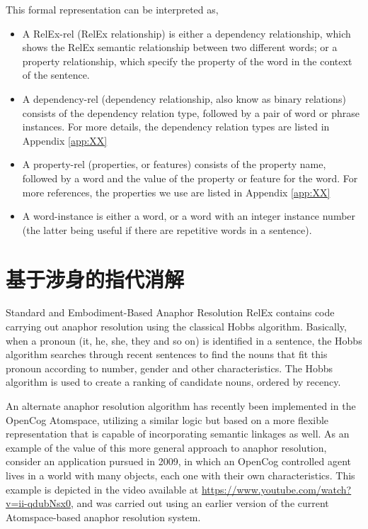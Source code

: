 This formal representation can be interpreted as,

\begin{itemize}
\item A RelEx-rel (RelEx relationship) is either a dependency relationship, which shows the RelEx semantic relationship between two different words;
  or a property relationship, which specify the property of the word in the context of the sentence. 
\item A dependency-rel (dependency relationship, also know as binary relations) consists of the dependency relation type, followed by a pair of word or phrase instances. For more details, the dependency relation types are listed in Appendix \ref{app:XX}
\item A property-rel (properties, or features) consists of the property name, followed by a word and the value of the property or feature for the word. For more references, the properties we use are listed in Appendix \ref{app:XX}
\item A word-instance is either a word, or a word with an integer instance number (the latter being useful if  there are repetitive words in a sentence). 
\end{itemize}

\section{基于涉身的指代消解}{Standard and Embodiment-Based Anaphor Resolution}
RelEx contains code carrying out anaphor resolution using  the classical Hobbs algorithm\cite{Hobbs1978}. Basically, when a pronoun (it, he, she, they and so on) is identified in a sentence, the Hobbs algorithm searches through recent sentences to find the nouns that fit this pronoun according to number, gender and other characteristics. The Hobbs algorithm is used to create a ranking of candidate nouns, ordered by recency.

An alternate anaphor resolution algorithm has recently been implemented in the OpenCog Atomspace, utilizing a similar logic but based on a more flexible representation that is capable of incorporating semantic linkages as well.   As an example of the value of this more general approach to anaphor resolution, consider an application pursued in 2009, in which an OpenCog controlled agent lives in a world with many objects, each one with their own characteristics.   This example is depicted in the video available at \url{https://www.youtube.com/watch?v=ii-qdubNsx0}, and was carried out using an earlier version of the current Atomspace-based anaphor resolution system.

